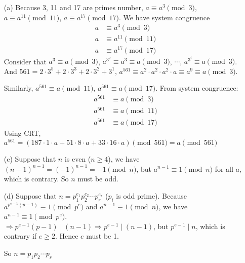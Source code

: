 \begin{exer}[3.14]
	\begin{enumerate}
		\item [(a)] Because 3, 11 and 17 are primes number, $a \equiv a^3 \pmod 3$, $a \equiv a^{11} \pmod{11}$, $a \equiv a^{17} \pmod{17}$. We have system congruence
		\begin{align*}
			a & \equiv a^3 \pmod 3 \\ a & \equiv a^{11} \pmod{11} \\ a & \equiv a^{17} \pmod{17}
		\end{align*}
		Consider that $a^3 \equiv a \pmod 3$, $a^{3^2} \equiv a^3 \equiv a \pmod 3$, $\cdots$, $a^{3^i} \equiv a \pmod 3$. And $561 = 2 \cdot 3^5 + 2 \cdot 3^3 + 2 \cdot 3^2 + 3^1$, $a^{561} \equiv a^2 \cdot a^2 \cdot a^2 \cdot a \equiv a^9 \equiv a \pmod 3$.
		
		Similarly, $a^{561} \equiv a \pmod{11}$, $a^{561} \equiv a \pmod{17}$. From system congruence:
		\begin{align*}
			a^{561} & \equiv a \pmod 3 \\ a^{561} & \equiv a \pmod{11} \\ a^{561} & \equiv a \pmod{17}
		\end{align*}
		Using CRT, $a^{561} = (187 \cdot 1 \cdot a + 51 \cdot 8 \cdot a + 33 \cdot 16 \cdot a) \pmod{561} = a \pmod{561}$
		\item [(c)] Suppose that $n$ is even ($n \geq 4$), we have $(n-1)^{n-1} = (-1)^{n-1} = -1 \pmod n$, but $a^{n-1} \equiv 1 \pmod n$ for all $a$, which is contrary. So $n$ must be odd.
		\item [(d)] Suppose that $n = p_1^{e_1} p_2^{e_2} \cdots p_r^{e_r}$ ($p_i$ is odd prime). Because $a^{p^{e-1} (p-1)} \equiv 1 \pmod{p^e}$ and $a^{n-1} \equiv 1 \pmod n$, we have $a^{n-1} \equiv 1 \pmod{p^e}$. \\ $\Rightarrow p^{e-1}(p-1) \mid (n-1) \Rightarrow p^{e-1} \mid (n-1)$, but $p^{e-1} \mid n$, which is contrary if $e \geq 2$. Hence $e$ must be 1.
		
		So $n = p_1 p_2 \cdots p_r$
	\end{enumerate}	
\end{exer}

